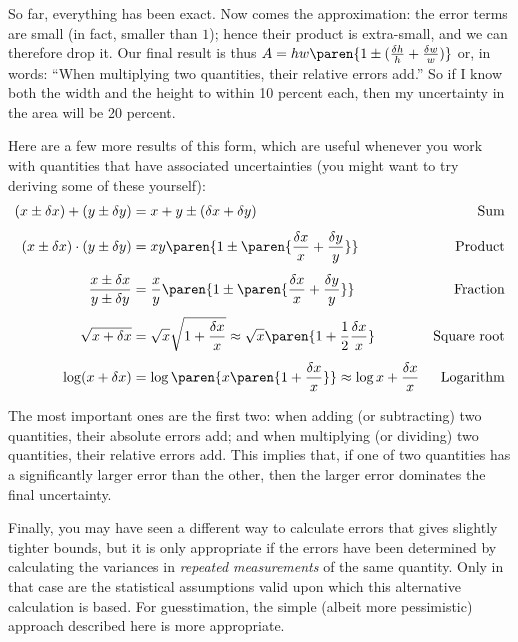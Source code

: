 So far, everything has been exact. Now comes the approximation: the
error terms are small (in fact, smaller than $1$); hence their product
is extra-small, and we can therefore drop it. Our final result is thus
$A = h w \paren{ 1 \pm ( \frac{\delta h}{h} + \frac{\delta w}{w} ) }$
or, in words: ``When multiplying two quantities, their relative errors
add.''  So if I know both the width and the height to within 10
percent each, then my uncertainty in the area will be 20 percent.

Here are a few more results of this form, which are useful whenever
you work with quantities that have associated uncertainties (you 
might want to try deriving some of these yourself):
\begin{align*}
( x \pm \delta x ) + ( y \pm \delta y ) 
  & = x + y \pm ( \delta x + \delta y ) 
  & \text{Sum} \\[4pt]
( x \pm \delta x ) \cdot ( y \pm \delta y ) 
  & = x y \paren{ 1 \pm \paren{ \frac{\delta x}{x} + \frac{\delta y}{y} }}
  & \text{Product} \\[4pt]
\frac{ x \pm \delta x }{ y \pm \delta y }
  & = \frac{x}{y} \paren{ 1 \pm \paren{ \frac{\delta x}{x} 
                                        + \frac{\delta y}{y} } }
  & \text{Fraction} \\[4pt]
\sqrt{x+\delta x} 
  & = \sqrt{x} \sqrt{1 + \frac{\delta x}{x} }
    \approx \sqrt{x} \paren{ 1 + \frac{1}{2} \frac{\delta x}{x} } 
  & \text{Square root} \\[4pt]
\log( x+\delta x)
  & = \log \paren{ x \paren{1 + \frac{\delta x}{x} } }
    \approx \log x + \frac{\delta x}{x}
  & \text{Logarithm}
\end{align*}

The most important ones are the first two: when adding (or
subtracting) two quantities, their absolute errors add; and when
multiplying (or dividing) two quantities, their relative errors add.
This implies that, if one of two quantities has a significantly larger
error than the other, then the larger error dominates the final
uncertainty.

Finally, you may have seen a different way to calculate errors that
gives slightly tighter bounds, but it is only appropriate if the
errors have been determined by calculating the variances in
\emph{repeated measurements} of the same quantity. Only in that case
are the statistical assumptions valid upon which this alternative
calculation is based.  For guesstimation, the simple (albeit more
pessimistic) approach described here is more appropriate.

